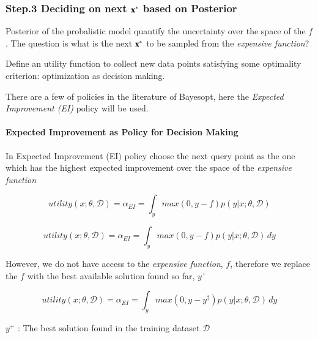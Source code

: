 \documentclass[]{elsarticle} %
\begin{document}
\hypertarget{step.3-deciding-on-next-bfxast-based-on-posterior}{%
\subsubsection{\texorpdfstring{Step.3 Deciding on next \(\bf{x}^\ast\) based on Posterior}{Step.3 Deciding on next \textbackslash bf\{x\}\^{}\textbackslash ast based on Posterior}}\label{step.3-deciding-on-next-bfxast-based-on-posterior}}

Posterior of the probalistic model quantify the uncertainty over the
space of the \(f\). The question is what is the next \(\bf{x}^\ast\) to be
sampled from the \emph{expensive function}?

Define an utility function to collect new data points satisfying some
optimality criterion: optimization as decision making.

There are a few of policies in the literature of Bayesopt, here the
\emph{Expected Improvement (EI)} policy will be used.

\hypertarget{expected-improvement-as-policy-for-decision-making}{%
\paragraph{Expected Improvement as Policy for Decision Making}\label{expected-improvement-as-policy-for-decision-making}}

In Expected Improvement (EI) policy choose the next query point as the
one which has the highest expected improvement over the space of the
\emph{expensive function}

\begin{equation}
utility(x;\theta,\mathcal{D})=\alpha_{EI}=\int_{y}^{}max(0,y-f)p(y|x;\theta,\mathcal{D})
\label{eq:uti_int}
\end{equation}

\[utility(x;\theta,\mathcal{D})=\alpha_{EI}=\int_{y}^{}max(0,y-f)p(y|x;\theta,\mathcal{D}) \,dy\]

However, we do not have access to the \emph{expensive function}, \(f\),
therefore we replace the \(f\) with the best available solution found so
far, \(y^+\)

\begin{equation}
utility(x;\theta,\mathcal{D})=\alpha_{EI}=\int_{y}^{}max(0,y-y^{\dagger})p(y|x;\theta,\mathcal{D}) \,dy
\label{eq:uti_int_2}
\end{equation}

\(y^{+}\) : The best solution found in the training dataset \(\mathcal{D}\)
\end{document}
